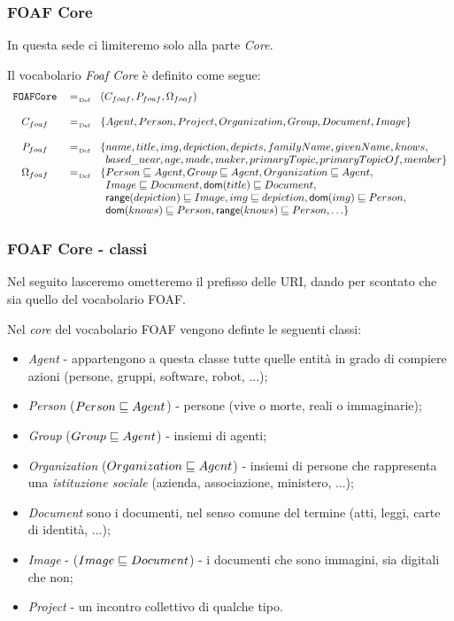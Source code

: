 \documentclass[8pt]{beamer}
\begin{document}
\newcommand{\foafcore}{\mathtt{FOAFCore}}
\begin{frame}
  \frametitle{FOAF Core}

  In questa sede ci limiteremo solo alla parte \emph{Core}.
  \vspace{\baselineskip}
  
  Il vocabolario \emph{Foaf Core} \`e definito come segue:
\[
 \begin{array}{ccl}
 \foafcore & \defAs & (C_{foaf}, P_{foaf}, \Omega_{foaf}) \\
 &&\\
 C_{foaf} & \defAs & \{Agent, Person, Project, Organization, Group, Document, Image\}\\
 &&\\
 P_{foaf} & \defAs & \{name, title, img, depiction, depicts, familyName, givenName, knows,\\
 && \phantom{\}} based\_near, age, made, maker, primaryTopic, primaryTopicOf, member \}\\
 \Omega_{foaf} & \defAs & \{ Person \Issub Agent, Group \Issub Agent, Organization \Issub Agent, \\
 && \phantom{\{} Image \Issub Document, \dom(title) \Issub Document, \\
 && \phantom{\{}\range(depiction) \Issub Image, img \Issub depiction, \dom(img) \Issub Person,\\
 && \phantom{\{}\dom(knows) \Issub Person, \range(knows) \Issub Person, \ldots \}\\
 \end{array}
\]
\end{frame}


\begin{frame}
  \frametitle{FOAF Core - classi}
  Nel seguito lasceremo ometteremo il prefisso delle URI, dando per scontato che sia 
  quello del vocabolario FOAF.
  \vspace{\baselineskip}
  
  Nel \emph{core} del vocabolario FOAF vengono definte le seguenti classi:
  
  \begin{itemize}[<+->]
   \item \emph{Agent} - appartengono a questa classe tutte quelle entit\`a in grado di compiere azioni
   (persone, gruppi, software, robot, ...);   
   \item \emph{Person} ($Person \sqsubseteq Agent$) - persone (vive o morte, reali o immaginarie);
   \item \emph{Group} ($Group \sqsubseteq Agent$) - insiemi di agenti;
   \item \emph{Organization} ($Organization \sqsubseteq Agent$) - insiemi di persone che rappresenta una \emph{istituzione sociale} (azienda, associazione, ministero, ...);
   \item \emph{Document} sono i documenti, nel senso comune del termine (atti, leggi, carte di identit\`a, ...);
   \item \emph{Image} - ($Image \sqsubseteq Document$) - i documenti che sono immagini, sia digitali che non;
   \item \emph{Project} - un incontro collettivo di qualche tipo.
  \end{itemize}
\end{frame}
\end{document}
